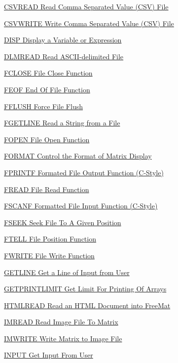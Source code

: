 
\begin{DoxyItemize}
\item \hyperlink{io_csvread}{C\-S\-V\-R\-E\-A\-D Read Comma Separated Value (C\-S\-V) File}  
\item \hyperlink{io_csvwrite}{C\-S\-V\-W\-R\-I\-T\-E Write Comma Separated Value (C\-S\-V) File}  
\item \hyperlink{io_disp}{D\-I\-S\-P Display a Variable or Expression}  
\item \hyperlink{io_dlmread}{D\-L\-M\-R\-E\-A\-D Read A\-S\-C\-I\-I-\/delimited File}  
\item \hyperlink{io_fclose}{F\-C\-L\-O\-S\-E File Close Function}  
\item \hyperlink{io_feof}{F\-E\-O\-F End Of File Function}  
\item \hyperlink{io_fflush}{F\-F\-L\-U\-S\-H Force File Flush}  
\item \hyperlink{io_fgetline}{F\-G\-E\-T\-L\-I\-N\-E Read a String from a File}  
\item \hyperlink{io_fopen}{F\-O\-P\-E\-N File Open Function}  
\item \hyperlink{io_format}{F\-O\-R\-M\-A\-T Control the Format of Matrix Display}  
\item \hyperlink{io_fprintf}{F\-P\-R\-I\-N\-T\-F Formated File Output Function (C-\/\-Style)}  
\item \hyperlink{io_fread}{F\-R\-E\-A\-D File Read Function}  
\item \hyperlink{io_fscanf}{F\-S\-C\-A\-N\-F Formatted File Input Function (C-\/\-Style)}  
\item \hyperlink{io_fseek}{F\-S\-E\-E\-K Seek File To A Given Position}  
\item \hyperlink{io_ftell}{F\-T\-E\-L\-L File Position Function}  
\item \hyperlink{io_fwrite}{F\-W\-R\-I\-T\-E File Write Function}  
\item \hyperlink{io_getline}{G\-E\-T\-L\-I\-N\-E Get a Line of Input from User}  
\item \hyperlink{io_getprintlimit}{G\-E\-T\-P\-R\-I\-N\-T\-L\-I\-M\-I\-T Get Limit For Printing Of Arrays}  
\item \hyperlink{io_htmlread}{H\-T\-M\-L\-R\-E\-A\-D Read an H\-T\-M\-L Document into Free\-Mat}  
\item \hyperlink{io_imread}{I\-M\-R\-E\-A\-D Read Image File To Matrix}  
\item \hyperlink{io_imwrite}{I\-M\-W\-R\-I\-T\-E Write Matrix to Image File}  
\item \hyperlink{io_input}{I\-N\-P\-U\-T Get Input From User}  

\end{DoxyItemize}
